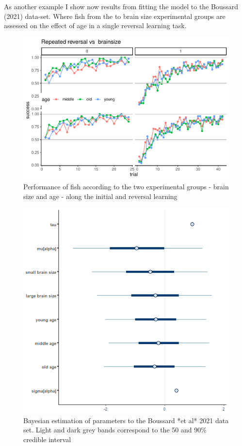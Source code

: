 \documentclass[
]{article}
\begin{document}
As another example I show now results from fitting the model to the
Boussard (2021) data-set. Where fish from the to brain size experimental
groups are assessed on the effect of age in a single reversal learning
task.

\begin{figure}

\includegraphics{report_files/figure-latex/unnamed-chunk-7-1} \hfill{}

\caption{Performance of fish according to the two experimental groups  - brain size and age - along the initial and reversal learning}\label{fig:unnamed-chunk-7}
\end{figure}

\begin{figure}

\includegraphics[width=6.67in,]{images/boussard2intervals} \hfill{}

\caption{Bayesian estimation of parameters to the Boussard *et al* 2021 data set. Light and dark grey bands correspond to the 50 and 90\% credible interval}\label{fig:unnamed-chunk-8}
\end{figure}
\end{document}
